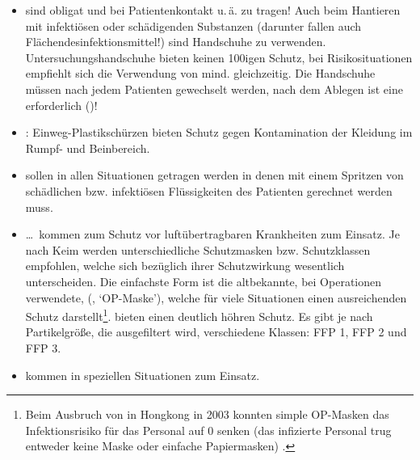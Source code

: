 {\label{topic:schutzkleidung-hygiene}%
\begin{itemize}
  \item {} sind obligat und
   bei Patientenkontakt u.\,ä. zu tragen! Auch
  beim Hantieren mit infektiösen oder schädigenden
  Substanzen (darunter fallen auch
  Flächendesinfektionsmittel!) sind Handschuhe zu verwenden.
  Untersuchungshandschuhe bieten keinen 100\PC*igen Schutz,
  bei Risikosituationen empfiehlt sich die Verwendung von
  mind.  gleichzeitig.
  Die Handschuhe müssen nach jedem Patienten gewechselt
  werden, nach dem Ablegen ist eine  erforderlich
  ()!
  \item {}: Einweg-Plastikschürzen bieten Schutz
  gegen Kontamination der Kleidung im Rumpf- und
  Beinbereich.
  \item {} sollen in allen Situationen
  getragen werden in denen mit einem Spritzen von
  schädlichen bzw. infektiösen Flüssigkeiten des Patienten
  gerechnet werden muss.
  \item {} \label{topic:atemmasken}%
  \ldots\ kommen zum Schutz vor
  luftübertragbaren Krankheiten zum Einsatz. Je nach Keim
  werden unterschiedliche Schutzmasken bzw. Schutzklassen empfohlen, welche sich
  bezüglich ihrer Schutzwirkung wesentlich unterscheiden.
  Die einfachste Form ist die altbekannte, bei Operationen verwendete,
  (, \enquote*{OP-Maske}), welche für viele Situationen einen
  ausreichenden Schutz darstellt\footnote{Beim Ausbruch von
   in Hongkong in 2003 konnten simple OP-Masken das
  Infektionsrisiko für das Personal auf 0 senken (das
  infizierte Personal trug entweder keine Maske oder einfache
  Papiermasken) \cite{Seto2003}.}.
   bieten einen deutlich höhren Schutz.
  Es gibt je nach Partikelgröße, die
  ausgefiltert wird, verschiedene Klassen: FFP 1, FFP 2 und FFP
  3.
  \item {} kommen in speziellen Situationen zum
  Einsatz.
\end{itemize}

}{

}{}{}{}



